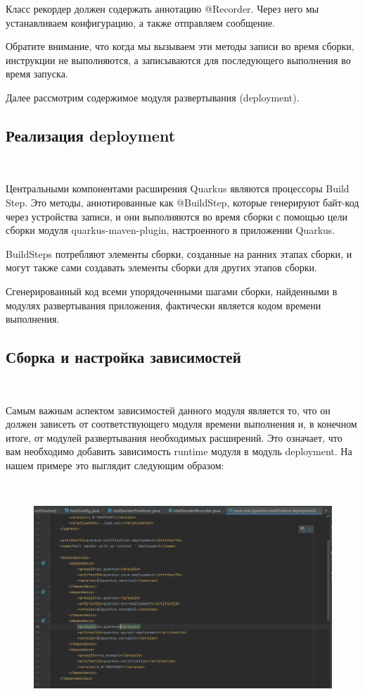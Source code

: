 \documentclass[russian,11pt]{article}
\begin{document}
	Класс рекордер должен содержать аннотацию @Recorder. Через него мы устанавливаем конфигурацию, а также отправляем сообщение.
	
	Обратите внимание, что когда мы вызываем эти методы записи во время сборки, инструкции не выполняются, а записываются для последующего выполнения во время запуска.
	
Далее рассмотрим содержимое модуля развертывания (deployment).

\subsection{Реализация deployment}
~

Центральными компонентами расширения Quarkus являются процессоры Build Step. Это методы, аннотированные как @BuildStep, которые генерируют байт-код через устройства записи, и они выполняются во время сборки с помощью цели сборки модуля quarkus-maven-plugin, настроенного в приложении Quarkus.

	BuildSteps потребляют элементы сборки, созданные на ранних этапах сборки, и могут также сами создавать элементы сборки для других этапов сборки.

	Сгенерированный код всеми упорядоченными шагами сборки, найденными в модулях развертывания приложения, фактически является кодом времени выполнения.

\subsection{Сборка и настройка зависимостей}
~

Самым важным аспектом зависимостей данного модуля является то, что он должен зависеть от соответствующего модуля времени выполнения и, в конечном итоге, от модулей развертывания необходимых расширений. Это означает, что вам необходимо добавить зависимость runtime модуля в модуль deployment. На нашем примере это выглядит следующим образом:

~

\begin{figure}[H]
	\centering
	\includegraphics[width=\textwidth]{9}
\end{figure}
\end{document}

